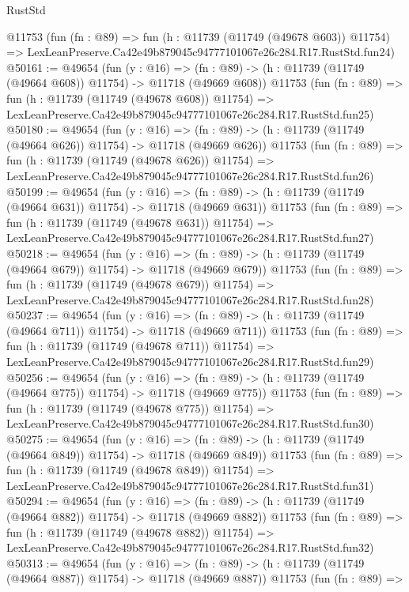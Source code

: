 \begin{lexlean}{RustStd}
\begin{coremodule}
    @11753
    (fun (fn : @89) =>
    fun (h : @11739 (@11749 (@49678 @603)) @11754) =>
    LexLeanPreserve.Ca42e49b879045c94777101067e26c284.R17.RustStd.fun24)
@50161 := @49654
    (fun (y : @16) =>
    (fn : @89) -> (h : @11739 (@11749 (@49664 @608)) @11754) -> @11718 (@49669 @608))
    @11753
    (fun (fn : @89) =>
    fun (h : @11739 (@11749 (@49678 @608)) @11754) =>
    LexLeanPreserve.Ca42e49b879045c94777101067e26c284.R17.RustStd.fun25)
@50180 := @49654
    (fun (y : @16) =>
    (fn : @89) -> (h : @11739 (@11749 (@49664 @626)) @11754) -> @11718 (@49669 @626))
    @11753
    (fun (fn : @89) =>
    fun (h : @11739 (@11749 (@49678 @626)) @11754) =>
    LexLeanPreserve.Ca42e49b879045c94777101067e26c284.R17.RustStd.fun26)
@50199 := @49654
    (fun (y : @16) =>
    (fn : @89) -> (h : @11739 (@11749 (@49664 @631)) @11754) -> @11718 (@49669 @631))
    @11753
    (fun (fn : @89) =>
    fun (h : @11739 (@11749 (@49678 @631)) @11754) =>
    LexLeanPreserve.Ca42e49b879045c94777101067e26c284.R17.RustStd.fun27)
@50218 := @49654
    (fun (y : @16) =>
    (fn : @89) -> (h : @11739 (@11749 (@49664 @679)) @11754) -> @11718 (@49669 @679))
    @11753
    (fun (fn : @89) =>
    fun (h : @11739 (@11749 (@49678 @679)) @11754) =>
    LexLeanPreserve.Ca42e49b879045c94777101067e26c284.R17.RustStd.fun28)
@50237 := @49654
    (fun (y : @16) =>
    (fn : @89) -> (h : @11739 (@11749 (@49664 @711)) @11754) -> @11718 (@49669 @711))
    @11753
    (fun (fn : @89) =>
    fun (h : @11739 (@11749 (@49678 @711)) @11754) =>
    LexLeanPreserve.Ca42e49b879045c94777101067e26c284.R17.RustStd.fun29)
@50256 := @49654
    (fun (y : @16) =>
    (fn : @89) -> (h : @11739 (@11749 (@49664 @775)) @11754) -> @11718 (@49669 @775))
    @11753
    (fun (fn : @89) =>
    fun (h : @11739 (@11749 (@49678 @775)) @11754) =>
    LexLeanPreserve.Ca42e49b879045c94777101067e26c284.R17.RustStd.fun30)
@50275 := @49654
    (fun (y : @16) =>
    (fn : @89) -> (h : @11739 (@11749 (@49664 @849)) @11754) -> @11718 (@49669 @849))
    @11753
    (fun (fn : @89) =>
    fun (h : @11739 (@11749 (@49678 @849)) @11754) =>
    LexLeanPreserve.Ca42e49b879045c94777101067e26c284.R17.RustStd.fun31)
@50294 := @49654
    (fun (y : @16) =>
    (fn : @89) -> (h : @11739 (@11749 (@49664 @882)) @11754) -> @11718 (@49669 @882))
    @11753
    (fun (fn : @89) =>
    fun (h : @11739 (@11749 (@49678 @882)) @11754) =>
    LexLeanPreserve.Ca42e49b879045c94777101067e26c284.R17.RustStd.fun32)
@50313 := @49654
    (fun (y : @16) =>
    (fn : @89) -> (h : @11739 (@11749 (@49664 @887)) @11754) -> @11718 (@49669 @887))
    @11753
    (fun (fn : @89) =>

\end{coremodule}
\end{lexlean}
